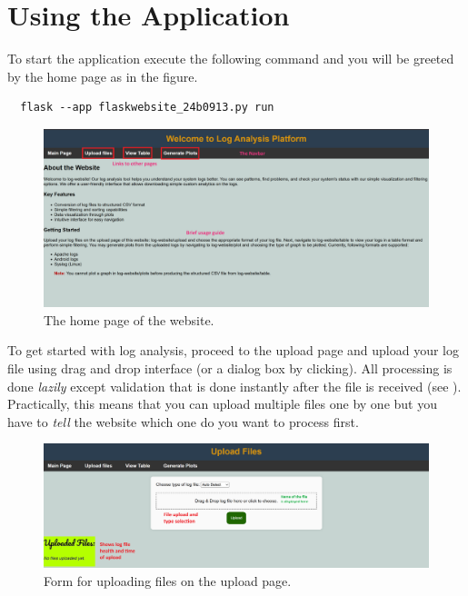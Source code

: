 \documentclass[11pt]{scrartcl}
\begin{document}
\section{Using the Application}

To start the application execute the following command
and you will be greeted by the home page as in the figure.

\begin{verbatim}
  flask --app flaskwebsite_24b0913.py run
\end{verbatim}


\begin{figure}[htbp]
  
  \centering
  \includegraphics[width=\linewidth]{images/homepage.png}
  \caption{The home page of the website.}
  \label{homepage}

\end{figure}

To get started with log analysis, proceed to the upload page and upload your log
file using drag and drop interface (or a dialog box by clicking). All processing
is done \emph{lazily} except validation that is done instantly after the file is
received (see ). Practically, this means that you can upload
multiple files one by one but you have to \emph{tell} the website which one do you
want to process first.



\begin{figure}[htbp]
  
  \centering
  \includegraphics[width=\linewidth]{images/uploadpage.png}
  \caption{Form for uploading files on the upload page.}
  \label{uploadpage}

\end{figure}
\end{document}
